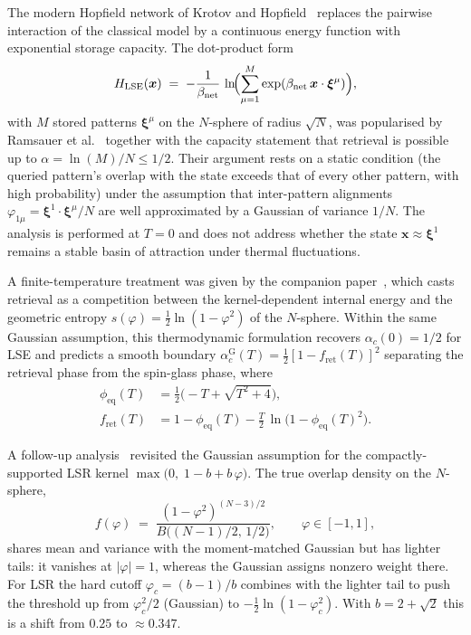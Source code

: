 \documentclass[11pt]{article}
\newcommand{\bxi}{\boldsymbol{\xi}}
\newcommand{\bx}{\bm{x}}
\newcommand{\Bnet}{\beta_{\mathrm{net}}}
\newcommand{\phieq}{\phi_{\mathrm{eq}}}
\newcommand{\fret}{f_{\mathrm{ret}}}
\newcommand{\acGauss}{\alpha_c^{\mathrm{G}}}
\begin{document}
The modern Hopfield network of Krotov and Hopfield~\citep{krotov2016dense}
replaces the pairwise interaction of the classical model by a continuous
energy function with exponential storage capacity. The dot-product form
\begin{equation}
H_{\mathrm{LSE}}(\bx) \;=\; -\frac{1}{\Bnet}\,\ln\!
\Bigl(\sum_{\mu=1}^{M} \exp(\Bnet\,\bx\cdot\bxi^\mu)\Bigr),
\label{eq:lse-energy}
\end{equation}
with $M$ stored patterns $\bxi^\mu$ on the $N$-sphere of radius $\sqrt{N}$,
was popularised by Ramsauer et al.~\citep{ramsauer2021hopfield} together
with the capacity statement that retrieval is possible up to
$\alpha = \ln(M)/N \le 1/2$. Their argument rests on a static condition
(the queried pattern's overlap with the state exceeds that of every other
pattern, with high probability) under the assumption that inter-pattern
alignments $\varphi_{1\mu} = \bxi^1\!\cdot\bxi^\mu / N$ are well approximated
by a Gaussian of variance $1/N$. The analysis is performed at $T=0$ and does
not address whether the state $\bx\!\approx\bxi^1$ remains a stable basin of
attraction under thermal fluctuations.

A finite-temperature treatment was given by the
companion paper~\citep{icml2026theory}, which casts retrieval as a
competition between the kernel-dependent internal energy and the geometric
entropy $s(\varphi) = \tfrac12 \ln(1-\varphi^2)$ of the $N$-sphere. Within
the same Gaussian assumption, this thermodynamic formulation recovers
$\alpha_c(0) = 1/2$ for LSE and predicts a smooth boundary
$\acGauss(T) = \tfrac12[1-\fret(T)]^2$ separating the retrieval phase from
the spin-glass phase, where
\begin{align}
\phieq(T)   &= \tfrac12\bigl(-T + \sqrt{T^2+4}\bigr),
\label{eq:phieq}\\
\fret(T)    &= 1 - \phieq(T) - \tfrac{T}{2}\,\ln\!\bigl(1-\phieq(T)^2\bigr).
\label{eq:fret}
\end{align}

A follow-up analysis~\citep{petrova2026metastable} revisited the Gaussian
assumption for the compactly-supported LSR kernel
$\max\bigl(0,\;1-b+b\,\varphi\bigr)$. The true overlap density on the
$N$-sphere,
\begin{equation}
f(\varphi) \;=\; \frac{(1-\varphi^2)^{(N-3)/2}}
                       {B\!\bigl((N-1)/2,\,1/2\bigr)},
\qquad \varphi\in[-1,1],
\label{eq:exact-density}
\end{equation}
shares mean and variance with the moment-matched Gaussian but has lighter
tails: it vanishes at $|\varphi|=1$, whereas the Gaussian assigns
nonzero weight there. For LSR the hard cutoff $\varphi_c = (b-1)/b$
combines with the lighter tail to push the threshold up from
$\varphi_c^2/2$ (Gaussian) to $-\tfrac12 \ln(1-\varphi_c^2)$. With
$b = 2+\sqrt{2}$ this is a shift from $0.25$ to $\approx 0.347$.
\end{document}
